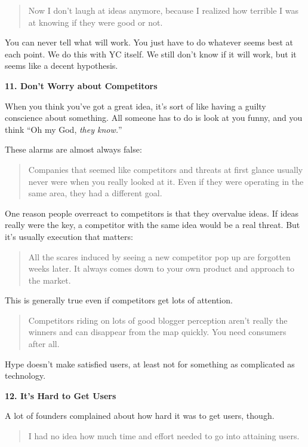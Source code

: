 \begin{quote}
Now I don't laugh at ideas anymore, because I realized how terrible I
was at knowing if they were good or not.
\end{quote}

You can never tell what will work. You just have to do whatever seems
best at each point. We do this with YC itself. We still don't know if it
will work, but it seems like a decent hypothesis.

\textbf{11. Don't Worry about Competitors}

When you think you've got a great idea, it's sort of like having a
guilty conscience about something. All someone has to do is look at you
funny, and you think ``Oh my God, \emph{they know.}''

These alarms are almost always false:

\begin{quote}
Companies that seemed like competitors and threats at first glance
usually never were when you really looked at it. Even if they were
operating in the same area, they had a different goal.
\end{quote}

One reason people overreact to competitors is that they overvalue ideas.
If ideas really were the key, a competitor with the same idea would be a
real threat. But it's usually execution that matters:

\begin{quote}
All the scares induced by seeing a new competitor pop up are forgotten
weeks later. It always comes down to your own product and approach to
the market.
\end{quote}

This is generally true even if competitors get lots of attention.

\begin{quote}
Competitors riding on lots of good blogger perception aren't really the
winners and can disappear from the map quickly. You need consumers after
all.
\end{quote}

Hype doesn't make satisfied users, at least not for something as
complicated as technology.

\textbf{12. It's Hard to Get Users}

A lot of founders complained about how hard it was to get users, though.

\begin{quote}
I had no idea how much time and effort needed to go into attaining
users.
\end{quote}

